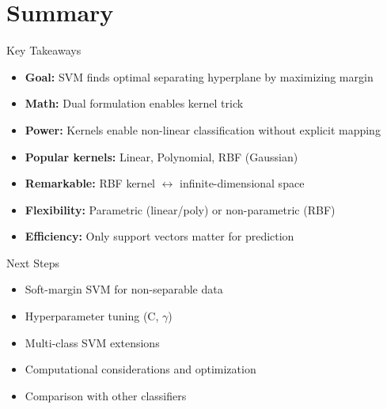\documentclass{beamer}
\begin{document}
		{
	
}

\section{Summary}

\begin{frame}{Key Takeaways}
\begin{itemize}
\item \textbf{Goal:} SVM finds optimal separating hyperplane by maximizing margin
	\pause
\item \textbf{Math:} Dual formulation enables kernel trick
	\pause
\item \textbf{Power:} Kernels enable non-linear classification without explicit mapping
	\pause
\item \textbf{Popular kernels:} Linear, Polynomial, RBF (Gaussian)
	\pause
\item \textbf{Remarkable:} RBF kernel $\leftrightarrow$ infinite-dimensional space
	\pause
\item \textbf{Flexibility:} Parametric (linear/poly) or non-parametric (RBF)
	\pause
\item \textbf{Efficiency:} Only support vectors matter for prediction
\end{itemize}
\end{frame}

\begin{frame}{Next Steps}
\begin{itemize}
\item Soft-margin SVM for non-separable data
	\item Hyperparameter tuning (C, $\gamma$)
	\pause
\item Multi-class SVM extensions
	\item Computational considerations and optimization
	\item Comparison with other classifiers
\end{itemize}
\end{frame}
\end{document}
